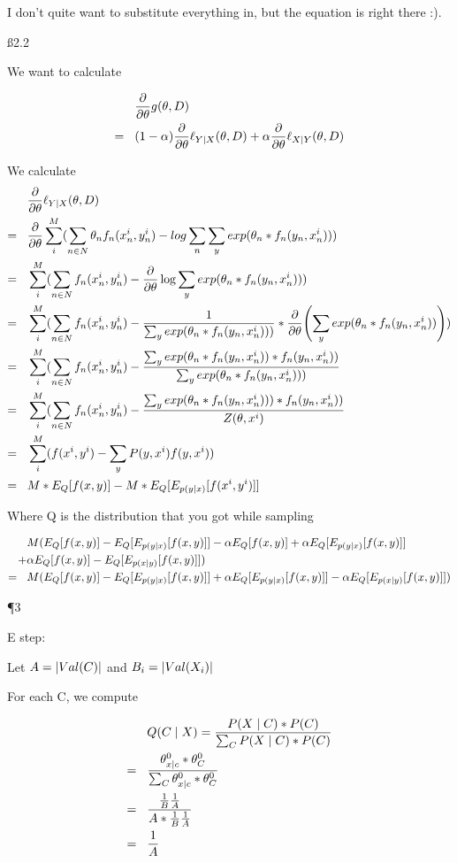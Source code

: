I don't quite want to substitute everything in, but the equation is right there :).

\ss{2.2}

We want to calculate 

\def\t{\pdv{\theta}}

\begin{align*}
& \pdv{\theta} g(\theta,D) \nl
(1-\alpha)\t\ell_{Y \mid X}(\theta, D) + \alpha\t\ell_{X \mid Y}(\theta,D)
\end{align*}

We calculate 
\begin{align*}
& \t\ell_{Y \mid X}(\theta, D) \nl 
\t \sum_i^M (\sum_{n \in N} \theta_n f_n(x_n^i,y_n^i) - log \sum_n \sum_y exp(\theta_n * f_n(y_n,x_n^i))) \nl 
\sum_i^M (\sum_{n \in N} f_n(x_n^i,y_n^i) - \t\log \sum_y exp(\theta_n * f_n(y_n,x_n^i))) \nl 
\sum_i^M (\sum_{n \in N} f_n(x_n^i,y_n^i) - \frac{1}{ \sum_y exp(\theta_n * f_n(y_n,x_n^i)))} * \t ( \sum_y exp(\theta_n * f_n(y_n,x_n^i)))) \nl 
\sum_i^M (\sum_{n \in N} f_n(x_n^i,y_n^i) - \frac{ \sum_y exp(\theta_n * f_n(y_n,x_n^i)) * f_n(y_n,x_n^i))}{ \sum_y exp(\theta_n * f_n(y_n,x_n^i)))} \nl 
\sum_i^M (\sum_{n \in N} f_n(x_n^i,y_n^i) - \frac{ \sum_y exp(\theta_n * f_n(y_n,x_n^i))) * f_n(y_n,x_n^i))}{Z(\theta, x^i)} \nl
\sum_i^M (f(x^i,y^i) - \sum_y P(y,x^i) f(y,x^i)) \nl
M*E_Q[f(x,y)] - M*E_Q [E_{p(y \mid x)}[f(x^i,y^i)]]
\end{align*}

 Where Q is the distribution that you got while sampling 
 
\begin{align*}
 & M(E_Q[f(x,y)] - E_Q[E_{p(y \mid x)}[f(x,y)]] - \alpha E_Q[f(x,y)] + \alpha E_Q[E_{p(y \mid x)}[f(x,y)]] \\  + & \alpha E_Q[f(x,y)] - E_Q[E_{p(x \mid y)}[f(x,y)]]) \\ = \hspace{3 mm} & M(E_Q[f(x,y)] - E_Q[E_{p(y \mid x)}[f(x,y)]] + \alpha E_Q[E_{p(y \mid x)}[f(x,y)]] - \alpha E_Q[E_{p(x \mid y)}[f(x,y)]])
\end{align*}

\P 3

E step:

Let $A = \abs{Val(C)}$ and $B_i = \abs{Val(X_i)}$

For each C, we compute

\begin{align*}
& Q(C \mid X) = \frac{P(X \mid C) * P(C)}{\sum_C P(X \mid C) * P(C)} \\ = \hspace{3 mm} &
\frac{\theta_{x\mid c}^0 * \theta_C^0}{\sum_C \theta_{x\mid c}^0 * \theta_C^0} \\ = \hspace{3 mm} &
\frac{\frac{1}{B}\frac{1}{A}}{A*\frac{1}{B}\frac{1}{A}} \\ = \hspace{3 mm} &
\frac{1}{A}
\end{align*}

